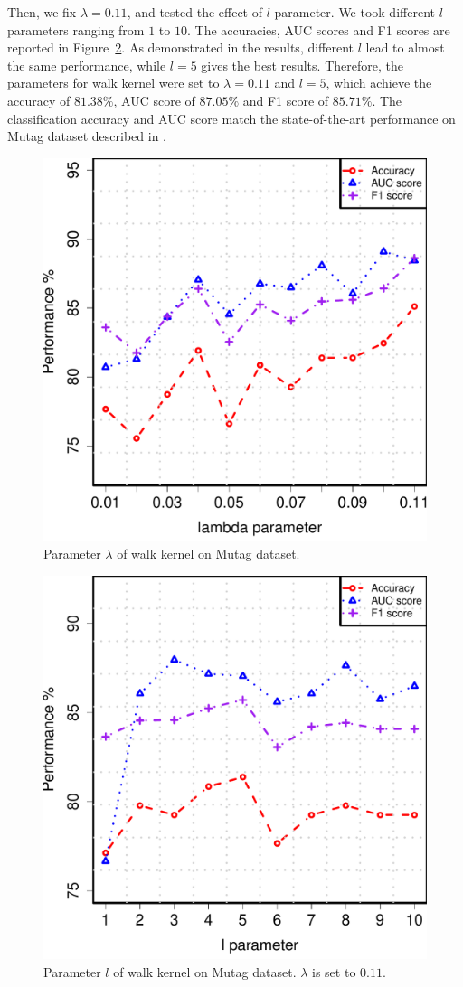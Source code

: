 \documentclass[english]{tktltiki}
\begin{document}
Then, we fix $\lambda = 0.11$, and tested the effect of $l$ parameter. We took different $l$ parameters ranging from $1$ to $10$. The accuracies, AUC scores and F1 scores are reported in Figure~\ref{result_mutag_l}. As demonstrated in the results, different $l$ lead to almost the same performance, while $l = 5$ gives the best results. Therefore, the parameters for walk kernel were set to $\lambda = 0.11$ and $l=5$, which achieve the accuracy of $81.38\%$, AUC score of $87.05\%$ and F1 score of $85.71\%$. The classification accuracy and AUC score match the state-of-the-art performance on Mutag dataset described in \cite{mahe04}.

\begin{figure}[t]
\begin{center}
\centering
\includegraphics[width=0.6\columnwidth]{./plots/result_mutag_lambda.pdf}
\caption[Parameter $\lambda$ of walk kernel.]{Parameter $\lambda$ of walk kernel on Mutag dataset.}
\label{result_mutag_lambda}
\end{center}
\end{figure}

\begin{figure}[t]
\begin{center}
\centering
\includegraphics[width=0.6\columnwidth]{./plots/result_mutag_l.pdf}
\caption[Parameter $l$ of walk kernel.]{Parameter $l$ of walk kernel on Mutag dataset. $\lambda$ is set to $0.11$.}
\label{result_mutag_l}
\end{center}
\end{figure}
\end{document}
